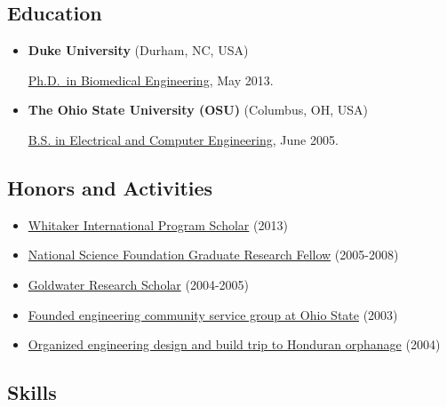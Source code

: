 \documentclass[]{article}
\begin{document}
\subsection{Education}\label{education}

\begin{itemize}
\item
  \textbf{Duke University} (Durham, NC, USA)

  \href{http://bme.duke.edu/grad}{Ph.D.~in Biomedical Engineering}, May
  2013.
\item
  \textbf{The Ohio State University (OSU)} (Columbus, OH, USA)

  \href{http://ece.osu.edu/futurestudents/undergrad}{B.S. in Electrical
  and Computer Engineering}, June 2005.
\end{itemize}

\subsection{Honors and Activities}\label{honors-and-activities}

\begin{itemize}
\itemsep1pt\parskip0pt
\item
  \href{http://www.whitaker.org/grants/fellows-scholars}{Whitaker
  International Program Scholar} (2013)
\item
  \href{http://www.nsfgrfp.org/}{National Science Foundation Graduate
  Research Fellow} (2005-2008)
\item
  \href{https://goldwater.scholarsapply.org/}{Goldwater Research
  Scholar} (2004-2005)
\item
  \href{http://ecos.osu.edu/}{Founded engineering community service
  group at Ohio State} (2003)
\item
  \href{http://www.montanadeluz.org/}{Organized engineering design and
  build trip to Honduran orphanage} (2004)
\end{itemize}

\subsection{Skills}\label{skills}
\end{document}
